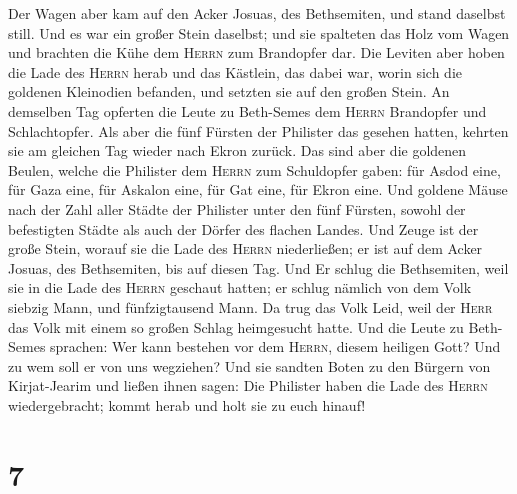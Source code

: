  Der Wagen aber kam auf den Acker Josuas, des
Bethsemiten, und stand daselbst still. Und es war ein großer Stein
daselbst; und sie spalteten das Holz vom Wagen und brachten die Kühe dem
\textsc{Herrn} zum Brandopfer dar.  Die Leviten aber
hoben die Lade des \textsc{Herrn} herab und das Kästlein, das dabei war,
worin sich die goldenen Kleinodien befanden, und setzten sie auf den
großen Stein. An demselben Tag opferten die Leute zu Beth-Semes dem
\textsc{Herrn} Brandopfer und Schlachtopfer.  Als aber
die fünf Fürsten der Philister das gesehen hatten, kehrten sie am
gleichen Tag wieder nach Ekron zurück.  Das sind aber die
goldenen Beulen, welche die Philister dem \textsc{Herrn} zum Schuldopfer
gaben: für Asdod eine, für Gaza eine, für Askalon eine, für Gat eine,
für Ekron eine.  Und goldene Mäuse nach der Zahl aller
Städte der Philister unter den fünf Fürsten, sowohl der befestigten
Städte als auch der Dörfer des flachen Landes. Und Zeuge ist der große
Stein, worauf sie die Lade des \textsc{Herrn} niederließen; er ist auf
dem Acker Josuas, des Bethsemiten, bis auf diesen Tag. 
Und Er schlug die Bethsemiten, weil sie in die Lade des \textsc{Herrn}
geschaut hatten; er schlug nämlich von dem Volk siebzig Mann, und
fünfzigtausend Mann. Da trug das Volk Leid, weil der \textsc{Herr} das
Volk mit einem so großen Schlag heimgesucht hatte.  Und
die Leute zu Beth-Semes sprachen: Wer kann bestehen vor dem
\textsc{Herrn}, diesem heiligen Gott? Und zu wem soll er von uns
wegziehen?  Und sie sandten Boten zu den Bürgern von
Kirjat-Jearim und ließen ihnen sagen: Die Philister haben die Lade des
\textsc{Herrn} wiedergebracht; kommt herab und holt sie zu euch hinauf!

\hypertarget{section-6}{%
\section{7}\label{section-6}}

